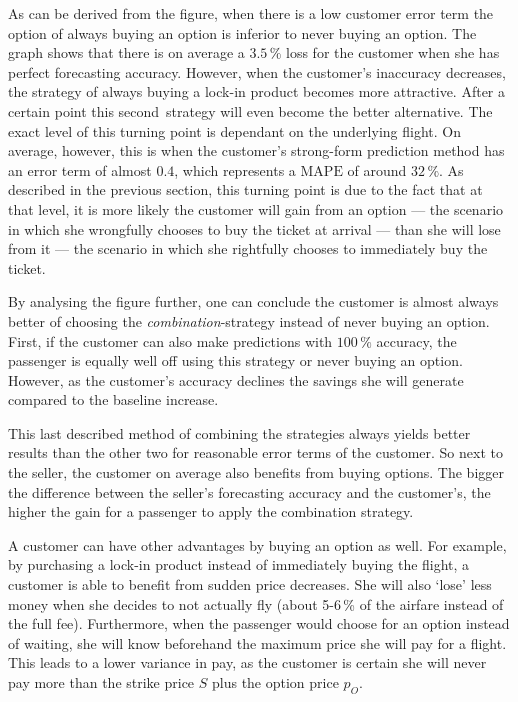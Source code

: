 As can be derived from the figure, when there is a low customer error term the option of always buying an option is inferior to never buying an option. The graph shows that there is on average a $3.5\,\%$ loss for the customer when she has perfect forecasting accuracy. However, when the customer's inaccuracy decreases, the strategy of always buying a lock-in product becomes more attractive. After a certain point this second~strategy will even become the better alternative. The exact level of this turning point is dependant on the underlying flight. On average, however, this is when the customer's strong-form prediction method has an error term of almost $0.4$, which represents a $\mbox{MAPE}$ of around $32\,\%$. As described in the previous section, this turning point is due to the fact that at that level, it is more likely the customer will gain from an option --- the scenario in which she wrongfully chooses to buy the ticket at arrival --- than she will lose from it --- the scenario in which she rightfully chooses to immediately buy the ticket.


By analysing the figure further, one can conclude the customer is almost always better of choosing the \emph{combination}-strategy instead of never buying an option. First, if the customer can also make predictions with $100\,\%$ accuracy, the passenger is equally well off using this strategy or never buying an option. However, as the customer's accuracy declines the savings she will generate compared to the baseline increase.


This last described method of combining the strategies always yields better results than the other two for reasonable error terms of the customer. So next to the seller, the customer on average also benefits from buying options. The bigger the difference between the seller's forecasting accuracy and the customer's, the higher the gain for a passenger to apply the combination strategy.

A customer can have other advantages by buying an option as well. For example, by purchasing a lock-in product instead of immediately buying the flight, a customer is able to benefit from sudden price decreases. She will also `lose' less money when she decides to not actually fly (about 5-6\,\% of the airfare instead of the full fee). Furthermore, when the passenger would choose for an option instead of waiting, she will know beforehand the maximum price she will pay for a flight. This leads to a lower variance in pay, as the customer is certain she will never pay more than the strike price $S$ plus the option price $p_O$.

